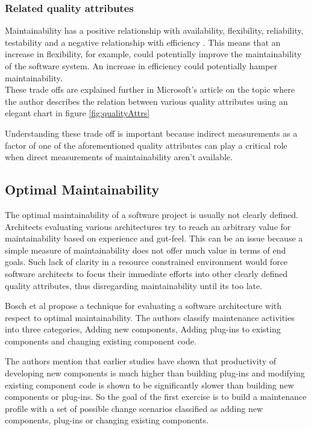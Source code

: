 \documentclass[15pt]{article}
\begin{document}
\subsubsection{Related quality attributes}
Maintainability has a positive relationship with availability, flexibility, reliability, testability and a negative relationship with efficiency \cite{karl_software_2003}. This means that an increase in flexibility, for example, could potentially improve the maintainability of the software system. An increase in efficiency could potentially hamper maintainability.\\



These trade offs are explained further in Microsoft's article on the topic \cite{morgan_implementing_2007} where the author describes the relation between various quality attributes using an elegant chart in figure  \ref{fig:qualityAttrs}

Understanding these trade off is important because indirect measurements as a factor of one of the aforementioned quality attributes can play a critical role when direct measurements of maintainability aren't available.

\subsection{Optimal Maintainability}

The optimal maintainability of a software project is usually not clearly defined. Architects evaluating various architectures try to reach an arbitrary value for maintainability based on experience and gut-feel. This can be an issue because a simple measure of maintainability does not offer much value in terms of end goals. Such lack of clarity in a resource constrained environment would force software architects to focus their immediate efforts into other clearly defined quality attributes, thus disregarding maintainability until its too late.

Bosch et al \cite{bosch_assessing_2001} propose a technique for evaluating a software architecture with respect to optimal maintainability. The authors classify maintenance activities into three categories, Adding new components, Adding plug-ins to existing components and changing existing component code.

The authors mention that earlier studies \cite{henry_quantitative_1997} \cite{maxwell_software_1996} have shown that productivity of developing new components is much higher than building plug-ins and modifying existing component code is shown to be significantly slower than building new components or plug-ins. So the goal of the first exercise is to build a maintenance profile with a set of possible change scenarios classified as adding new components, plug-ins or changing existing components. 
\end{document}
